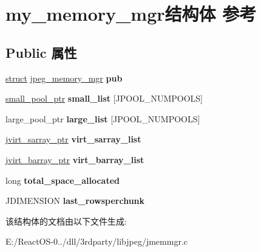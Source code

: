 \hypertarget{structmy__memory__mgr}{}\section{my\+\_\+memory\+\_\+mgr结构体 参考}
\label{structmy__memory__mgr}
\subsection*{Public 属性}
\begin{DoxyCompactItemize}
\item 
\mbox{\label{structmy__memory__mgr_a692dd77bfba8ab81c4f42643254d4528}} 
\hyperlink{interfacestruct}{struct} \hyperlink{structjpeg__memory__mgr}{jpeg\+\_\+memory\+\_\+mgr} {\bfseries pub}
\item 
\mbox{\label{structmy__memory__mgr_a1c2bfaa346643520a2ff682c38e4ce0d}} 
\hyperlink{unionsmall__pool__struct}{small\+\_\+pool\+\_\+ptr} {\bfseries small\+\_\+list} \mbox{[}J\+P\+O\+O\+L\+\_\+\+N\+U\+M\+P\+O\+O\+LS\mbox{]}
\item 
\mbox{\label{structmy__memory__mgr_af8257908eac43538230773374417739b}} 
large\+\_\+pool\+\_\+ptr {\bfseries large\+\_\+list} \mbox{[}J\+P\+O\+O\+L\+\_\+\+N\+U\+M\+P\+O\+O\+LS\mbox{]}
\item 
\mbox{\label{structmy__memory__mgr_ad613a2a2e52ac069c63fd083c9c91f04}} 
\hyperlink{structjvirt__sarray__control}{jvirt\+\_\+sarray\+\_\+ptr} {\bfseries virt\+\_\+sarray\+\_\+list}
\item 
\mbox{\label{structmy__memory__mgr_a09b8c66f15f14f1c3c247d98d6c81bbc}} 
\hyperlink{structjvirt__barray__control}{jvirt\+\_\+barray\+\_\+ptr} {\bfseries virt\+\_\+barray\+\_\+list}
\item 
\mbox{\label{structmy__memory__mgr_acfcdee3e2d3e3d168e2a2aebe081535f}} 
long {\bfseries total\+\_\+space\+\_\+allocated}
\item 
\mbox{\label{structmy__memory__mgr_a7e30eb574b588f102f07d0ddb94d177d}} 
J\+D\+I\+M\+E\+N\+S\+I\+ON {\bfseries last\+\_\+rowsperchunk}
\end{DoxyCompactItemize}


该结构体的文档由以下文件生成\+:\begin{DoxyCompactItemize}
\item 
E\+:/\+React\+O\+S-\/0../dll/3rdparty/libjpeg/jmemmgr.\+c\end{DoxyCompactItemize}
